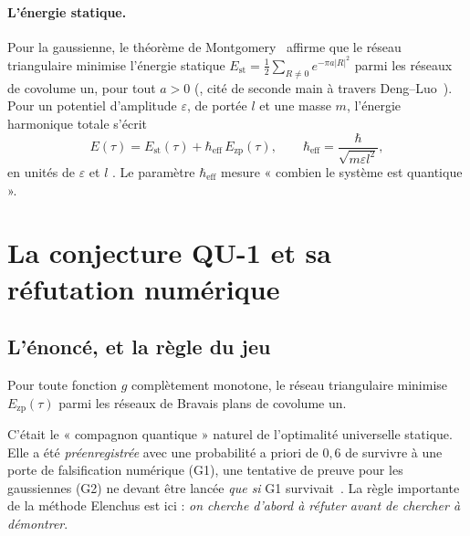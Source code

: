 \paragraph{L'énergie statique.} Pour la gaussienne, le théorème de Montgomery~\cite{montgomery} affirme que le réseau
triangulaire minimise l'énergie statique $E_{\mathrm{st}}=\tfrac12\sum_{R\ne0}e^{-\pi a|R|^2}$ parmi les réseaux de
covolume un, pour tout $a>0$ (\tierL, cité de seconde main à travers Deng--Luo~\cite{ch3-dengluo}). Pour un potentiel
d'amplitude $\varepsilon$, de portée $l$ et une masse $m$, l'énergie harmonique totale s'écrit
\begin{equation}\label{ch3:eq:total}
E(\tau)=E_{\mathrm{st}}(\tau)+\hbar_{\mathrm{eff}}\,E_{\mathrm{zp}}(\tau),\qquad\hbar_{\mathrm{eff}}=\frac{\hbar}{\sqrt{m\varepsilon l^2}} ,
\end{equation}
en unités de $\varepsilon$ et $l$ \tierC. Le paramètre $\hbar_{\mathrm{eff}}$ mesure « combien le système est
quantique ».

\section{La conjecture QU-1 et sa réfutation numérique}\label{ch3:sec:qu1}

\subsection{L'énoncé, et la règle du jeu}
\begin{definition}[Conjecture QU-1]\label{ch3:def:qu1}
Pour toute fonction $g$ complètement monotone, le réseau triangulaire minimise $E_{\mathrm{zp}}(\tau)$ parmi les réseaux de
Bravais plans de covolume un.
\end{definition}
\noindent C'était le « compagnon quantique » naturel de l'optimalité universelle statique. Elle a été
\emph{préenregistrée} avec une probabilité a priori de $0{,}6$ de survivre à une porte de falsification numérique (G1),
une tentative de preuve pour les gaussiennes (G2) ne devant être lancée \emph{que si} G1 survivait~\cite{ch3-p2zp}.
La règle importante de la méthode Elenchus est ici : \emph{on cherche d'abord à réfuter avant de chercher à démontrer}.

